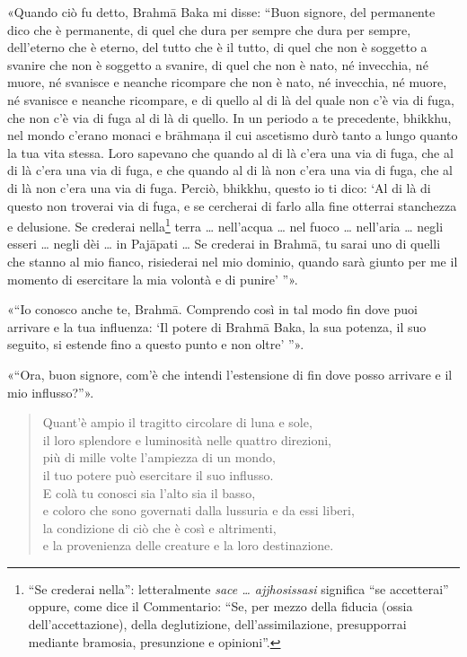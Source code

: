 «Quando ciò fu detto, Brahmā Baka mi disse: “Buon signore, del permanente dico
che è permanente, di quel che dura per sempre che dura per sempre, dell’eterno
che è eterno, del tutto che è il tutto, di quel che non è soggetto a svanire che
non è soggetto a svanire, di quel che non è nato, né invecchia, né muore, né
svanisce e neanche ricompare che non è nato, né invecchia, né muore, né svanisce
e neanche ricompare, e di quello al di là del quale non c’è via di fuga, che non
c’è via di fuga al di là di quello. In un periodo a te precedente, bhikkhu, nel
mondo c’erano monaci e brāhmaṇa il cui ascetismo durò tanto a lungo quanto la
tua vita stessa. Loro sapevano che quando al di là c’era una via di fuga, che al
di là c’era una via di fuga, e che quando al di là non c’era una via di fuga,
che al di là non c’era una via di fuga. Perciò, bhikkhu, questo io ti dico: ‘Al
di là di questo non troverai via di fuga, e se cercherai di farlo alla fine
otterrai stanchezza e delusione. Se crederai nella\footnote{“Se crederai nella”:
  letteralmente \emph{sace … ajjhosissasi} significa “se accetterai” oppure,
  come dice il Commentario: “Se, per mezzo della fiducia (ossia
  dell’accettazione), della deglutizione, dell’assimilazione, presupporrai
  mediante bramosia, presunzione e opinioni”.} terra … nell’acqua … nel fuoco …
nell’aria … negli esseri … negli dèi … in Pajāpati … Se crederai in Brahmā, tu
sarai uno di quelli che stanno al mio fianco, risiederai nel mio dominio, quando
sarà giunto per me il momento di esercitare la mia volontà e di punire’ ”».

«“Io conosco anche te, Brahmā. Comprendo così in tal modo fin dove puoi arrivare
e la tua influenza: ‘Il potere di Brahmā Baka, la sua potenza, il suo seguito,
si estende fino a questo punto e non oltre’ ”».

«“Ora, buon signore, com’è che intendi l’estensione di fin dove posso arrivare e
il mio influsso?”».

\begin{quote}
Quant’è ampio il tragitto circolare di luna e sole, \\
il loro splendore e luminosità nelle quattro direzioni, \\
più di mille volte l’ampiezza di un mondo, \\
il tuo potere può esercitare il suo influsso. \\
E colà tu conosci sia l’alto sia il basso, \\
e coloro che sono governati dalla lussuria e da essi liberi, \\
la condizione di ciò che è così e altrimenti, \\
e la provenienza delle creature e la loro destinazione.
\end{quote}

